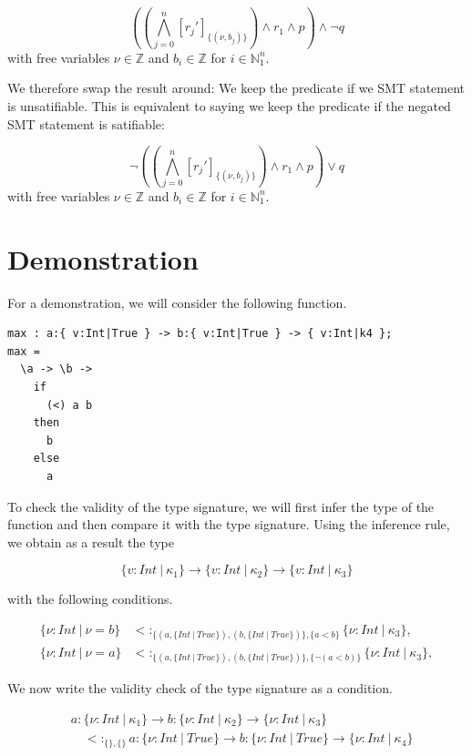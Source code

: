 \documentclass[]{scrbook}
\theoremstyle{definition}
\theoremstyle{definition}
\theoremstyle{definition}
\theoremstyle{remark}
\begin{document}
\[((\bigwedge_{j=0}^n [r_j']_{\{(\nu,b_j)\}})\land r_1\land p)\land \neg q\]
with free variables \(\nu\in\mathbb{Z}\) and \(b_i\in\mathbb{Z}\) for
\(i\in\mathbb{N}_1^n\).

We therefore swap the result around: We keep the predicate if we SMT
statement is unsatifiable. This is equivalent to saying we keep the
predicate if the negated SMT statement is satifiable:

\[\neg((\bigwedge_{j=0}^n [r_j']_{\{(\nu,b_j)\}})\land r_1\land p)\lor q
\] with free variables \(\nu\in\mathbb{Z}\) and \(b_i\in\mathbb{Z}\) for
\(i\in\mathbb{N}_1^n\).

\section{Demonstration}\label{demonstration}

For a demonstration, we will consider the following function.

\begin{verbatim}
max : a:{ v:Int|True } -> b:{ v:Int|True } -> { v:Int|k4 };
max =
  \a -> \b ->
    if 
      (<) a b
    then
      b
    else
      a
\end{verbatim}

To check the validity of the type signature, we will first infer the
type of the function and then compare it with the type signature. Using
the inference rule, we obtain as a result the type

\[
\{v:\mathit{Int}\ |\ \kappa_1\} \to \{v:\mathit{Int}\ |\ \kappa_2\} \to \{v:\mathit{Int}\ |\ \kappa_3\}
\]

with the following conditions.

\[
\begin{aligned}
\{\nu:\mathit{Int}\ |\ \nu = b\}&<:_{\{(a,\{\mathit{Int}\ |\ \mathit{True}\}),(b,\{\mathit{Int}\ |\ \mathit{True}\})\},\{a < b\}}\{\nu:\mathit{Int}\ |\ \kappa_3\},\\
  \{\nu:\mathit{Int}\ |\ \nu = a\}&<:_{\{(a,\{\mathit{Int}\ |\ \mathit{True}\}),(b,\{\mathit{Int}\ |\ \mathit{True}\})\},\{\neg (a < b)\}}\{\nu:\mathit{Int}\ |\ \kappa_3\},
\end{aligned}
\]

We now write the validity check of the type signature as a condition.

\[
\begin{aligned}
  & a:\{\nu:\mathit{Int}\ |\ \kappa_1\}\to b:\{\nu:\mathit{Int}\ |\ \kappa_2\}\to\{\nu:\mathit{Int}\ |\ \kappa_3\}\\
  &\quad<:_{\{\},\{\}}a:\{\nu:\mathit{Int}\ |\ \mathit{True}\}\to b:\{\nu:\mathit{Int}\ |\ \mathit{True}\}\to\{\nu:\mathit{Int}\ |\ \kappa_4\}\\
\end{aligned}
\]
\end{document}
